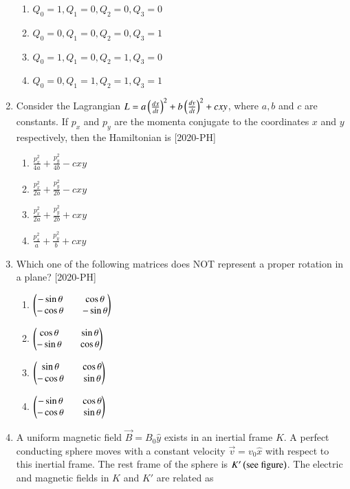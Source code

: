 \documentclass[journal]{IEEEtran}
\begin{document}
\begin{enumerate}[start=40]
\begin{enumerate}
    \item $Q_0=1, Q_1=0, Q_2=0, Q_3=0$
    \item $Q_0=0, Q_1=0, Q_2=0, Q_3=1$
    \item $Q_0=1, Q_1=0, Q_2=1, Q_3=0$
    \item $Q_0=0, Q_1=1, Q_2=1, Q_3=1$
\end{enumerate}
\item Consider the Lagrangian $L=a \left(\frac{dx}{dt}\right)^2 + b \left(\frac{dy}{dt}\right)^2 + cxy$, where $a, b$ and $c$ are constants. If $p_x$ and $p_y$ are the momenta conjugate to the coordinates $x$ and $y$ respectively, then the Hamiltonian is \hfill{[2020-PH]}\\
\begin{enumerate}
    \item $\frac{p_x ^2}{4a} + \frac{p_y ^2}{4b} - cxy$\\
    \item $\frac{p_x ^2}{2a} + \frac{p_y ^2}{2b} - cxy$\\
    \item $\frac{p_x ^2}{2a} + \frac{p_y ^2}{2b} + cxy$\\
    \item $\frac{p_x ^2}{a} + \frac{p_y ^2}{b} + cxy$\\
\end{enumerate}
\item Which one of the following matrices does NOT represent a proper rotation in a plane? \hfill{[2020-PH]}\\
\begin{enumerate}
    \item $\begin{pmatrix}-\sin \theta && \cos \theta\\ -\cos \theta && -\sin \theta\end{pmatrix}$\\
    \item $\begin{pmatrix}\cos \theta && \sin \theta\\ -\sin \theta && \cos \theta\end{pmatrix}$\\
    \item $\begin{pmatrix}\sin \theta && \cos \theta\\ -\cos \theta && \sin \theta\end{pmatrix}$\\
    \item $\begin{pmatrix}-\sin \theta && \cos \theta\\ -\cos \theta && \sin \theta\end{pmatrix}$\\
\end{enumerate}
\item A uniform magnetic field $\overrightarrow{B}=B_0 \hat{y}$ exists in an inertial frame $K$. A perfect conducting sphere moves with a constant velocity $\overrightarrow{v}=v_0 \hat{x}$ with respect to this inertial frame. The rest frame of the sphere is $K' \left(\text{see figure}\right)$. The electric and magnetic fields in $K$ and $K'$ are related as \\


\end{enumerate}
\end{document}
